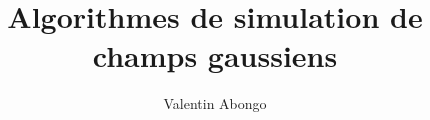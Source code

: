 \documentclass[a4paper,11pt]{memoir}
\title{Algorithmes de simulation de champs gaussiens}
\author{Valentin Abongo}
\theoremstyle{definition} \newtheorem{definition}{Définition}[section]
\theoremstyle{definition} \newtheorem{theorem}{Théorème}[section]
\theoremstyle{definition} \newtheorem{corollary}{Corollaire}[section]
\theoremstyle{definition} \newtheorem{property}{Propriété}[section]
\theoremstyle{definition} \newtheorem{hypothesis}{Hypothèse}[section]
\theoremstyle{remark} \newtheorem{remark}{Remarque}[section]
\begin{document}
\maketitle
\nocite{*}


\newpage

\tableofcontents


















\small{


}
\normalsize{}

\end{document}

